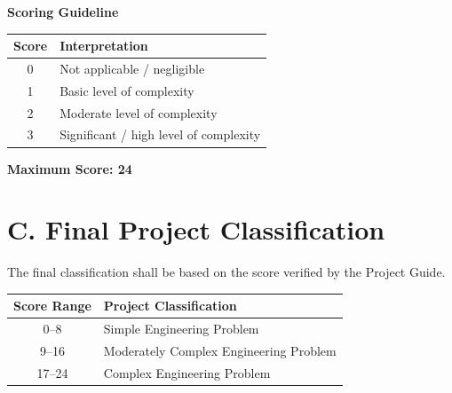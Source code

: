 
\vspace{0.3cm}

\noindent
\textbf{Scoring Guideline}

\vspace{0.1cm}

\begin{center}

\renewcommand{\arraystretch}{1.25}

\begin{tabular}{|c|p{8.5cm}|}
\hline
\textbf{Score} & \textbf{Interpretation} \\
\hline
0 & Not applicable / negligible \\
\hline
1 & Basic level of complexity \\
\hline
2 & Moderate level of complexity \\
\hline
3 & Significant / high level of complexity \\
\hline
\end{tabular}

\end{center}

\vspace{0.3cm}

\noindent
\textbf{Maximum Score: 24}

\newpage
\section*{C. Final Project Classification}

\noindent
The final classification shall be based on the score verified by the
Project Guide.

\vspace{0.25cm}

\begin{center}

\renewcommand{\arraystretch}{1.4}

\begin{tabular}{|c|p{6.5cm}|}
\hline
\textbf{Score Range} & \textbf{Project Classification} \\
\hline
0--8 & Simple Engineering Problem \\
\hline
9--16 & Moderately Complex Engineering Problem \\
\hline
17--24 & Complex Engineering Problem \\
\hline
\end{tabular}

\end{center}

